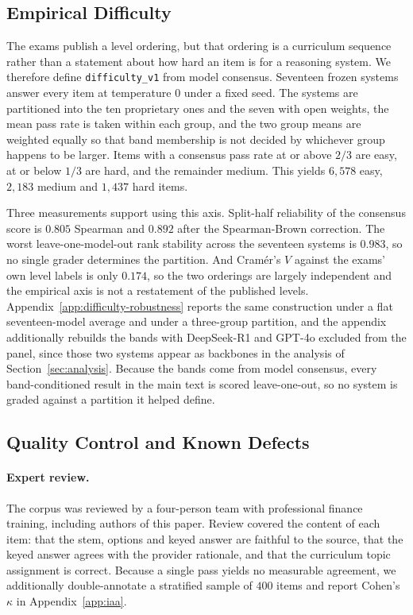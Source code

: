 \subsection{Empirical Difficulty}
\label{sec:difficulty}

The exams publish a level ordering, but that ordering is a curriculum sequence rather than a
statement about how hard an item is for a reasoning system. We therefore define
\texttt{difficulty\_v1} from model consensus. Seventeen frozen systems answer every item at
temperature $0$ under a fixed seed. The systems are partitioned into the ten proprietary ones
and the seven with open weights, the mean pass rate is taken
within each group, and the two group means are weighted equally so that band membership is not
decided by whichever group happens to be larger. Items with a consensus pass rate at or above
$2/3$ are easy, at or below $1/3$ are hard, and the remainder medium. This yields $6{,}578$ easy,
$2{,}183$ medium and $1{,}437$ hard items.

Three measurements support using this axis. Split-half reliability of the consensus score is
$0.805$ Spearman and $0.892$ after the Spearman-Brown correction. The worst leave-one-model-out
rank stability across the seventeen systems is $0.983$, so no single grader determines the
partition. And Cram\'er's $V$ against the exams' own level labels is only $0.174$, so the two
orderings are largely independent and the empirical axis is not a restatement of the published
levels. Appendix~\ref{app:difficulty-robustness} reports the same construction under a flat
seventeen-model average and under a three-group partition, and the appendix additionally rebuilds
the bands with DeepSeek-R1 and GPT-4o excluded from the panel, since those two systems appear as
backbones in the analysis of Section~\ref{sec:analysis}. Because the bands come from model
consensus, every band-conditioned result in the main text is scored leave-one-out, so no system
is graded against a partition it helped define.

\subsection{Quality Control and Known Defects}
\label{sec:quality}

\paragraph{Expert review.}
The corpus was reviewed by a four-person team with professional finance training, including
authors of this paper. Review covered the content of each item: that the stem, options and keyed
answer are faithful to the source, that the keyed answer agrees with the provider rationale, and
that the curriculum topic assignment is correct. Because a single pass yields no measurable
agreement, we additionally double-annotate a stratified sample of $400$ items and report Cohen's
$\kappa$ in Appendix~\ref{app:iaa}.

